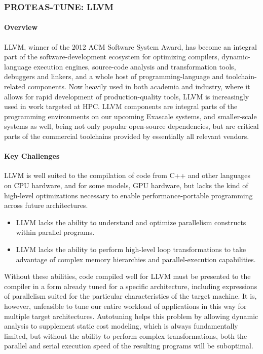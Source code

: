\subsubsection{ PROTEAS-TUNE: LLVM} 
\label{sec:PROTEAS_TUNE_LLVM}

\paragraph{Overview}

LLVM, winner of the 2012 ACM Software System Award, has become an integral part of the software-development ecosystem for optimizing compilers, dynamic-language execution engines, source-code analysis and transformation tools, debuggers and linkers, and a whole host of programming-language and toolchain-related components. Now heavily used in both academia and industry, where it allows for rapid development of production-quality tools, LLVM is increasingly used in work targeted at HPC. LLVM components are integral parts of the programming environments on our upcoming Exascale systems, and smaller-scale systems as well, being not only popular open-source dependencies, but are critical parts of the commercial toolchains provided by essentially all relevant vendors.

\paragraph{Key Challenges}

LLVM is well suited to the compilation of code from C++ and other languages on CPU hardware, and for some models, GPU hardware, but lacks the kind of high-level optimizations necessary to enable performance-portable programming across future architectures.
\begin{itemize}
\item LLVM lacks the ability to understand and optimize parallelism constructs within parallel programs.
\item LLVM lacks the ability to perform high-level loop transformations to take advantage of complex memory hierarchies and parallel-execution capabilities.
\end{itemize}

Without these abilities, code compiled well for LLVM must be presented to the compiler in a form already tuned for a specific architecture, including expressions of parallelism suited for the particular characteristics of the target machine. It is, however, unfeasible to tune our entire workload of applications in this way for multiple target architectures. Autotuning helps this problem by allowing dynamic analysis to supplement static cost modeling, which is always fundamentally limited, but without the ability to perform complex transformations, both the parallel and serial execution speed of the resulting programs will be suboptimal.

